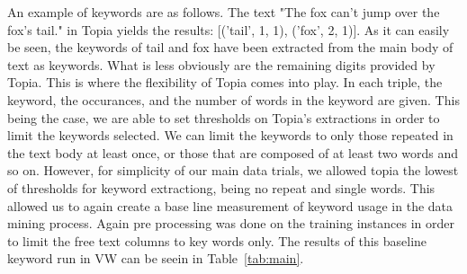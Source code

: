 An example of keywords are as follows. The text "The fox can't jump over the fox's tail." in Topia yields the results:
[('tail', 1, 1), ('fox', 2, 1)]. As it can easily be seen, the keywords of tail and fox have been extracted from the main body of
text as keywords. What is less obviously are the remaining digits provided by Topia. This is where the flexibility of Topia comes into
play. In each triple, the keyword, the occurances, and the number of words in the keyword are given. This being the case, we are
able to set thresholds on Topia's extractions in order to limit the keywords selected. We can limit the keywords to only those
repeated in the text body at least once, or those that are composed of at least two words and so on. However, for simplicity of
our main data trials, we allowed topia the lowest of thresholds for keyword extractiong, being no repeat and single words. This
allowed us to again create a base line measurement of keyword usage in the data mining process. Again pre processing was done on
the training instances in order to limit the free text columns to key words only. The results of this baseline keyword run
in VW can be seein in Table~\ref{tab:main}.